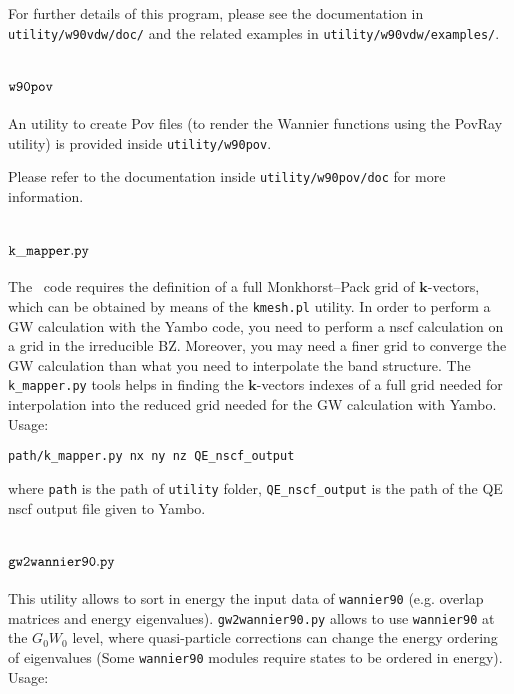 For further details of this program, please see the documentation
in \verb|utility/w90vdw/doc/| and the related examples in
\verb|utility/w90vdw/examples/|.

\section{$\tt{w90pov}$}
\label{sec:w90pov}

An utility to create Pov files (to render the Wannier functions using
the PovRay utility) is provided inside \verb|utility/w90pov|.

Please refer to the documentation inside \verb|utility/w90pov/doc|
for more information.


\section{$\tt{k\_mapper.py}$}
\label{sec:k_mapper}
The \wannier\ code requires the definition of a full Monkhorst--Pack
grid of $\mathbf{k}$-vectors, which can be obtained by means of the \verb|kmesh.pl| utility.
In order to perform a GW calculation with the Yambo code, you need to perform a nscf calculation on a grid in the irreducible BZ. Moreover, you may need a finer grid to converge the GW calculation than what you need to interpolate the band structure. The \verb|k_mapper.py| tools helps in finding the $\mathbf{k}$-vectors indexes of a full grid needed for interpolation into the reduced grid needed for the GW calculation with Yambo. \newline \newline
Usage:\newline 

\verb|path/k_mapper.py nx ny nz QE_nscf_output|\newline

where \verb|path| is the path of \verb|utility| folder, 
\verb|QE_nscf_output| is the path of the QE nscf output file given to Yambo. 
\section{$\tt{gw2wannier90.py}$}
This utility allows to sort in energy the input data of \verb|wannier90| (e.g. overlap matrices and energy eigenvalues). \verb|gw2wannier90.py| allows to use \verb|wannier90| at the $G_0W_0$ level, where quasi-particle corrections can change the energy ordering of eigenvalues (Some \verb|wannier90| modules require states to be ordered in energy).\newline \newline
Usage:

